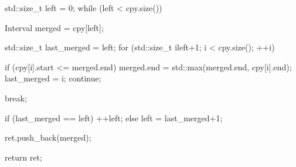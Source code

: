 \documentclass{report}
\begin{document}
\begin{itemize}
\begin{cppcode}
{                std::size_t left = 0;
                while (left < cpy.size()) {
                    Interval merged = cpy[left];

                    std::size_t last_merged = left;
                    for (std::size_t i{left+1}; i < cpy.size(); ++i) {
                        if (cpy[i].start <= merged.end) {
                            merged.end = std::max(merged.end, cpy[i].end);
                            last_merged = i;
                            continue;
                        }

                        break;
                    }

                    if (last_merged == left) ++left;
                    else left = last_merged+1;

                    ret.push_back(merged);
                }

                return ret;
            }
            \end{cppcode}


    \end{itemize}
   
\end{document}

